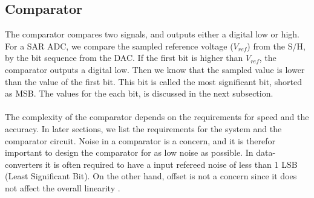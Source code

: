 \documentclass[english, 12pt, a4paper]{ifimaster}
\begin{document}
\subsection{Comparator}
The comparator compares two signals, and outputs either a digital low or high. For a SAR ADC, we compare the sampled reference voltage (\(V_{ref}\)) from the S/H, by the bit sequence from the DAC. 
If the first bit is higher than \(V_{ref}\), the comparator outputs a digital low. Then we know that the sampled value is lower than the value of the first bit. This bit is called the most 
significant bit, shorted as MSB. The values for the each bit, is discussed in the next subsection.\\
\\
The complexity of the comparator depends on the requirements for speed and the accuracy. In later sections, we list the requirements for the system and the comparator circuit. Noise in a comparator is a 
concern, and it is therefor important to design the comparator for as low noise as possible. In data-converters it is often required to have a input refereed noise of less than 1 LSB 
(Least Significant Bit). On the other hand, offset is not a concern since it does not affect the overall linearity \cite{sar-adc-concept}. 
\end{document}
